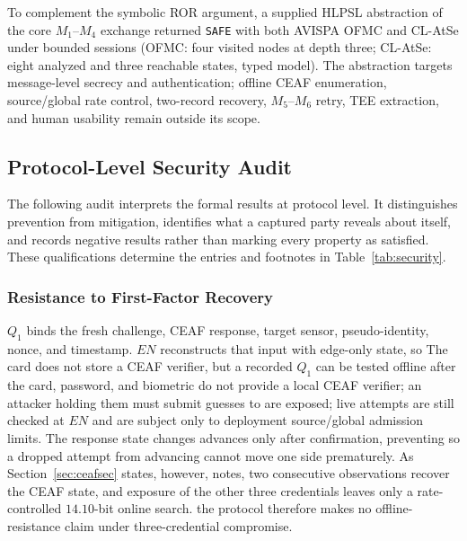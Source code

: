\documentclass[cmc,article,submit,moreauthors,pdftex]{Definitions/tsp}
\providecommand{\DIFadd}[1]{{\protect\color{blue} \sf #1}} %
\providecommand{\DIFdel}[1]{{\protect\color{red} \scriptsize #1}} %
\providecommand{\DIFaddbegin}{} %
\providecommand{\DIFaddend}{} %
\providecommand{\DIFdelbegin}{} %
\providecommand{\DIFdelend}{} %
\begin{document}
\DIFdelbegin %
\DIFdelend \DIFaddbegin \DIFadd{To complement the symbolic ROR argument, a supplied HLPSL abstraction of the core $M_1$--$M_4$ exchange returned \texttt{SAFE} with both AVISPA OFMC and CL-AtSe under bounded sessions (OFMC: four visited nodes at depth three; CL-AtSe: eight analyzed and three reachable states, typed model). The abstraction targets message-level secrecy and authentication; offline CEAF enumeration, source/global rate control, two-record recovery, $M_5$--$M_6$ retry, TEE extraction, and human usability remain outside its scope.
}

\subsection{Protocol-Level Security Audit}\DIFaddend \label{sec:informal}

\DIFdelbegin \DIFdel{The following audit interprets the formal results at protocol level. It distinguishes prevention from mitigation, identifies what a captured party reveals about itself, and records negative results rather than marking every property as satisfied.
These qualifications determine the entries and footnotes in Table~\ref{tab:security}.
}%

\DIFdelend \subsubsection{Resistance to First-Factor Recovery}

$Q_1$ binds the fresh challenge, CEAF response, target sensor, pseudo-identity, nonce, and timestamp. \DIFdelbegin \DIFdel{$EN$ reconstructs that input with edge-only state, so }\DIFdelend \DIFaddbegin \DIFadd{The card does not store a CEAF verifier, but a recorded $Q_1$ can be tested offline after }\DIFaddend the card, password, and biometric \DIFdelbegin \DIFdel{do not provide a local CEAF verifier; an attacker holding them must submit guesses to }\DIFdelend \DIFaddbegin \DIFadd{are exposed; live attempts are still checked at }\DIFaddend $EN$ \DIFaddbegin \DIFadd{and are subject only to deployment source/global admission limits}\DIFaddend . The response state \DIFdelbegin \DIFdel{changes }\DIFdelend \DIFaddbegin \DIFadd{advances }\DIFaddend only after confirmation, \DIFdelbegin \DIFdel{preventing }\DIFdelend \DIFaddbegin \DIFadd{so }\DIFaddend a dropped attempt \DIFdelbegin \DIFdel{from advancing }\DIFdelend \DIFaddbegin \DIFadd{cannot move }\DIFaddend one side prematurely. As Section~\ref{sec:ceafsec} \DIFdelbegin \DIFdel{states, however, }\DIFdelend \DIFaddbegin \DIFadd{notes, }\DIFaddend two consecutive observations recover the CEAF state, and \DIFdelbegin \DIFdel{exposure of the other three credentials leaves only a rate-controlled $14.10$-bit online search.
}\DIFdelend \DIFaddbegin \DIFadd{the protocol therefore makes no offline-resistance claim under three-credential compromise.
}\DIFaddend 
\end{document}
